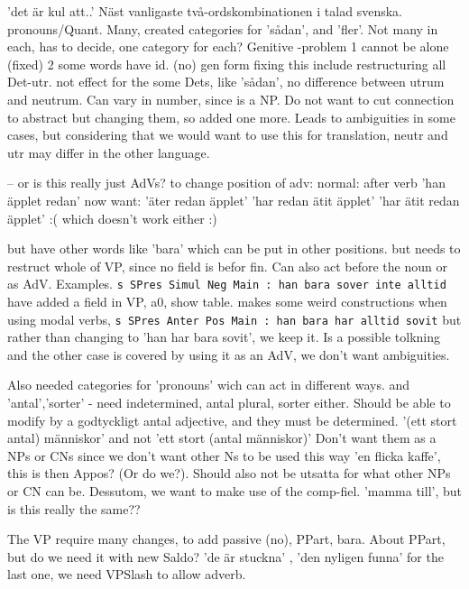 \documentclass{report}
\begin{document}
'det är kul att..' Näst vanligaste två-ordskombinationen i talad svenska.
pronouns/Quant. Many, created categories for 'sådan', and 'fler'. Not many in each,
has to decide, one category for each?
Genitive -problem 1 cannot be alone (fixed) 2 some words have id. (no) gen form
           fixing this include restructuring all
Det-utr. not effect for the some Dets, like 'sådan', no difference between utrum and neutrum.
 Can vary in number, since is a NP. Do not want to cut connection to abstract but changing them,
 so added one more. Leads to ambiguities in some cases, but considering that we would want to use
 this for translation, neutr and utr may differ in the other language.

-- or is this really just AdVs? 
to change position of adv:
normal: after verb 'han äpplet redan'
now want: 'äter redan äpplet'
          'har redan ätit äpplet' 
          'har ätit redan äpplet' :( which doesn't work either :)

but have other words like 'bara' which can be put in other positions.
  but needs to restruct whole of VP, since no field is befor fin.
  Can also act before the noun or as AdV. Examples.
\verb|s SPres Simul Neg Main : han bara sover inte alltid|
  have added a field in VP, a0, show table.
  makes some weird constructions when using modal verbs, 
  \verb|s SPres Anter Pos Main : han bara har alltid sovit|
  but rather than changing to 'han har bara sovit', we keep it. Is a possible
  tolkning and the other case is covered by using it as an AdV, we don't want
  ambiguities.

Also needed categories for 'pronouns' wich can act in different ways.
and 'antal','sorter' - need indetermined, antal plural, sorter either.
Should be able to modify by a godtyckligt antal adjective, and they must be determined.
'(ett stort antal) människor' and not 'ett stort (antal människor)'
Don't want them as a NPs or CNs since we don't want other Ns to be used this way
'en flicka kaffe', this is then Appos? (Or do we?). Should also not be utsatta for what other
NPs or CN can be. Dessutom, we want to make use of the comp-fiel. 'mamma till', but is this really
the same??

The VP require many changes, to add passive (no), PPart, bara.
About PPart, but do we need it with new Saldo? 'de är stuckna' , 'den nyligen funna'
for the last one, we need VPSlash to allow adverb.
\end{document}
